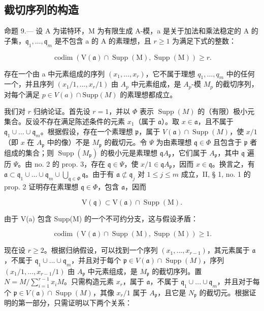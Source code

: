 \subsection{截切序列的构造}

命题 9.--- 设 A 为诺特环，M 为有限生成 A-模，a 是关于加法和乘法稳定的 A 的子集，\(\mathfrak{q}_{1},\ldots,\mathfrak{q}_{m}\) 是不包含 a 的 A 的素理想，且 \(r\geqslant1\) 为满足下式的整数：

\[
\operatorname{codim} (\mathrm{V} (\mathfrak {a}) \cap \operatorname{Supp} (\mathrm{M}), \operatorname{Supp} (\mathrm{M})) \geqslant r.\tag{21}
\]

存在一个由 a 中元素组成的序列 \((x_{1}, \ldots, x_{r})\)，它不属于理想 \(q_{1}, \ldots, q_{m}\) 中的任何一个，并且序列 \((x_{1}/1, \ldots, x_{r}/1)\) 由 \(A_{p}\) 中元素组成，是 \(A_{p}\)-模 \(M_{p}\) 的截切序列，对每个满足 \(p \in V(a) \cap \text{Supp}(M)\) 的素理想都成立。

我们对 \(r\) 归纳论证。首先设 \(r = 1\)，并以 \(\Phi\) 表示 \(\operatorname{Supp}(M)\) 的（有限）极小元集合。反设不存在满足陈述条件的元素 \(x_1\)（属于 \(\mathfrak{a}\)）。取 \(x \in \mathfrak{a}\)，且不属于 \(\mathfrak{q}_1 \cup \ldots \cup \mathfrak{q}_m\)。根据假设，存在一个素理想 \(\mathfrak{p}\)，属于 \(V(\mathfrak{a}) \cap \operatorname{Supp}(M)\)，使 \(x/1\)（即 \(x\) 在 \(A_{\mathfrak{p}}\) 中的像）不是 \(M_{\mathfrak{p}}\) 的截切元。令 \(\Psi\) 为由素理想 \(\mathfrak{q} \in \Phi\) 且包含于 \(\mathfrak{p}\) 者组成的集合；则 \(\operatorname{Supp}(M_{\mathfrak{p}})\) 的极小元是素理想 \(\mathfrak{q}A_{\mathfrak{p}}\)，它们属于 \(A_{\mathfrak{p}}\)，其中 \(\mathfrak{q}\) 遍历 \(\Psi\)。由 no. 2 的 prop. 3，存在 \(\mathfrak{q} \in \Psi\)，使 \(x/1 \in \mathfrak{q}A_{\mathfrak{p}}\)，因而 \(x \in \mathfrak{q}\)。换言之，有 \(\mathfrak{a} \subset \mathfrak{q}_1 \cup \ldots \cup \mathfrak{q}_m \cup \bigcup_{\mathfrak{q} \in \Phi} \mathfrak{q}\)。由于有 \(\mathfrak{a} \not\subset \mathfrak{q}_j\) 对 \(1 \leqslant j \leqslant m\) 成立，II, § 1, no. 1 的 prop. 2 证明存在素理想 \(\mathfrak{q} \in \Phi\)，包含 \(\mathfrak{a}\)，因而

\[
\mathrm{V} (\mathfrak {q}) \subset \mathrm{V} (\mathfrak {a}) \cap \operatorname{Supp} (\mathrm{M}).
\]

由于 V(a) 包含 Supp(M) 的一个不可约分支，这与假设矛盾：

\[
\operatorname{codim} (\mathrm{V} (\mathfrak {a}) \cap \operatorname{Supp} (\mathrm{M}), \operatorname{Supp} (\mathrm{M})) \geqslant 1.
\]

现在设 \(r \geqslant 2\)。根据归纳假设，可以找到一个序列 \((x_1, ..., x_{r-1})\)，其元素属于 \(\mathfrak{a}\)，不属于 \(\mathfrak{q}_1 \cup ... \cup \mathfrak{q}_m\)，并且对于每个 \(\mathfrak{p} \in V(\mathfrak{a}) \cap \operatorname{Supp}(M)\)，序列 \((x_1/1, ..., x_{r-1}/1)\) 由 \(A_{\mathfrak{p}}\) 中元素组成，是 \(M_{\mathfrak{p}}\) 的截切序列。置 \(N = M / \sum_{i=1}^{r-1} x_i M\)。只需构造元素 \(x_r\)，属于 \(\mathfrak{a}\)，不属于 \(\mathfrak{q}_1 \cup ... \cup \mathfrak{q}_m\)，并且对于每个 \(\mathfrak{p} \in V(\mathfrak{a}) \cap \operatorname{Supp}(M)\)，其像 \(x_r/1\) 属于 \(A_{\mathfrak{p}}\)，且它是 \(N_{\mathfrak{p}}\) 的截切元。根据证明的第一部分，只需证明以下两个关系：

